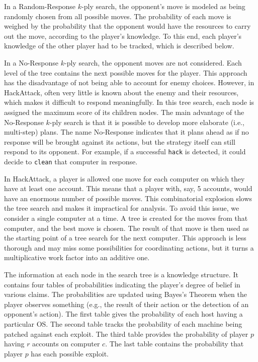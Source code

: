 \documentclass{sig-alternate}
\begin{document}
In a Random-Response $k$-ply search, the opponent's move is modeled as being randomly chosen from all possible moves. The probability of each move is weighed by the probability that the opponent would have the resources to carry out the move, according to the player's knowledge. To this end, each player's knowledge of the other player had to be tracked, which is described below.

In a No-Response $k$-ply search, the opponent moves are not considered. Each level of the tree contains the next possible moves for the player. This approach has the disadvantage of not being able to account for enemy choices. However, in HackAttack, often very little is known about the enemy and their resources, which makes it difficult to respond meaningfully. In this tree search, each node is assigned the maximum score of its children nodes. The main advantage of the No-Response $k$-ply search is that it is possible to develop more elaborate (i.e., multi-step) plans.
The name No-Response indicates that it plans ahead as if no response will be brought against its actions, but the strategy itself can still respond to its opponent. 
For example, if a successful {\tt hack} is detected, it could decide to {\tt clean} that computer in response.
 
In HackAttack, a player is allowed one move for each computer on which they have at least one account. This means that a player with, say, 5 accounts, would have an enormous number of possible moves. This combinatorial explosion slows the tree search and makes it impractical for analysis. To avoid this issue, we consider a single computer at a time. A tree is created for the moves from that computer, and the best move is chosen. The result of that move is then used as the starting point of a tree search for the next computer. This approach is less thorough and may miss some possibilities for coordinating actions, but it turns a multiplicative work factor into an additive one. 

The information at each node in the search tree is a knowledge structure. It contains four tables of probabilities indicating the player's degree of belief in various claims. 
The probabilities are updated using Bayes's Theorem when the player observes something (e.g., the result of their action or the detection of an opponent's action).
The first table gives the probability of each host having a particular OS. The second table tracks the probability of each machine being patched against each exploit. The third table provides the probability of player $p$ having $r$ accounts on computer $c$. The last table contains the probability that player $p$ has each possible exploit. 
\end{document}
